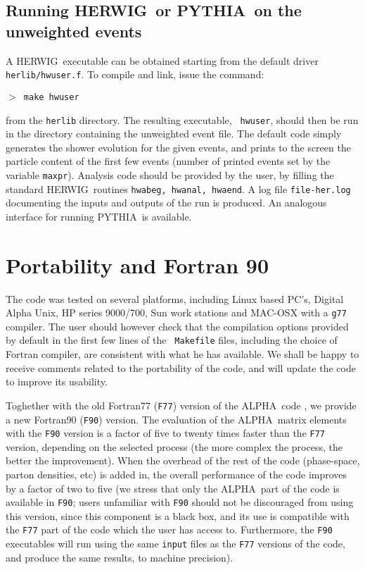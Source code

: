 \documentclass[paper]{JHEP3}
\def\herwig{{\small HERWIG}}
\def\pythia{{\small PYTHIA}}
\def\ALPHA{{\small ALPHA}}
\begin{document}
\begin{appendix}
\subsection{Running \herwig\ or \pythia\ on the unweighted events}
A \herwig\ executable can be obtained starting
from the default driver {\tt herlib/hwuser.f}. To compile and link,
issue the command:

{\tt $>$ make hwuser}

from the {\tt herlib} directory. The resulting executable, {\tt
  hwuser}, should then be run in the directory containing the
unweighted event file. The default code simply generates the shower
evolution for the given events, and prints to the screen the particle
content of the first few events (number of printed events
set by the variable {\tt maxpr}). Analysis code should be provided by
the user, by filling the standard \herwig\ routines {\tt hwabeg,
  hwanal, hwaend}. A log file {\tt file-her.log} documenting the
inputs and outputs of the run is produced.  An analogous interface for
running \pythia\ is available.

\section{Portability and  Fortran 90}
\label{sec:f90}
The code was tested on several platforms, including Linux based PC's,
Digital Alpha Unix, HP series 9000/700, Sun work stations and MAC-OSX
with a {\tt g77} compiler.
The user should however check that the compilation
options provided by default in the first few lines of the {\tt
  Makefile} files, including the choice of Fortran compiler, are
consistent with what he has available. We shall be happy to receive
comments related to the portability of the code, and will update the
code to improve its usability.

Toghether with the old Fortran77 ({\tt F77}) version of the \ALPHA\ code
\cite{Caravaglios:1995cd,Caravaglios:1999yr}, we provide a new 
  Fortran90 ({\tt F90}) version.  The evaluation of the \ALPHA\ matrix elements
with the {\tt F90} version is a factor of five to twenty times faster
than the {\tt F77} version, depending on the selected process (the
more complex the process, the better the improvement). When the
overhead of the rest of the code (phase-space, parton densities, etc)
is added in, the overall performance of the code improves by a factor
of two to five (we stress that only the \ALPHA\ part of the code is
available in {\tt F90}; users unfamiliar with {\tt F90} should not be
discouraged from using this version, since this component is a black
box, and its use is compatible with the {\tt F77} part of the code
which the user has access to. Furthermore, the {\tt F90} executables
will run using the same {\tt input} files as the {\tt F77} versions of
the code, and produce the same results, to machine precision).


\end{appendix}
\end{document}
